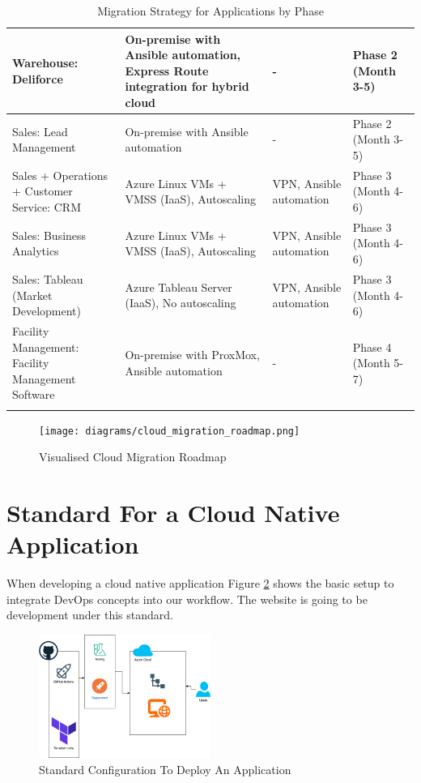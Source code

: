 \documentclass{llncs}
\begin{document}
\begin{longtable}{|p{3.1cm}|p{5.2cm}|p{3.1cm}|l|}
    \hline
    Warehouse: Deliforce & On-premise with Ansible automation, Express Route integration for hybrid cloud & - & Phase 2 (Month 3-5) \\
    \hline
    Sales: Lead Management & On-premise with Ansible automation & - & Phase 2 (Month 3-5) \\
    \hline
    Sales + Operations + Customer Service: CRM & Azure Linux VMs + VMSS (IaaS), Autoscaling & VPN, Ansible automation & Phase 3 (Month 4-6) \\
    \hline
    Sales: Business Analytics & Azure Linux VMs + VMSS (IaaS), Autoscaling & VPN, Ansible automation & Phase 3 (Month 4-6) \\
    \hline
    Sales: Tableau (Market Development) & Azure Tableau Server (IaaS), No autoscaling & VPN, Ansible automation & Phase 3 (Month 4-6) \\
    \hline
    Facility Management: Facility Management Software & On-premise with ProxMox, Ansible automation & - & Phase 4 (Month 5-7) \\
    \hline
    \caption{Migration Strategy for Applications by Phase}
    \end{longtable}

\begin{figure}[htbp]
        \begin{center}
            \texttt{[image: diagrams/cloud\_migration\_roadmap.png]}
            \vspace{0.01\textwidth}
            \caption{Visualised Cloud Migration Roadmap}
            \label{cloud migration roadmap} %
        \end{center}
\end{figure}
    

\section{Standard For a Cloud Native Application}

When developing a cloud native application Figure \ref{CloudStandard} shows the basic setup to integrate DevOps concepts into our workflow.
The website is going to be development under this standard.\\

\begin{figure}[htbp]
    \begin{center}
        \includegraphics[width=0.5\textwidth]{diagrams/AppStandard.drawio.png}
        \vspace{0.01\textwidth}
        \caption{Standard Configuration To Deploy An Application}
        \label{CloudStandard} %
    \end{center}
\end{figure}
\end{document}
